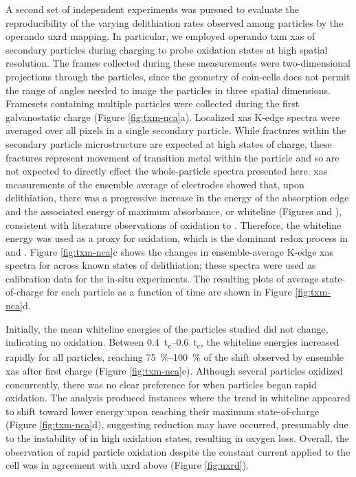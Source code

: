 \documentclass{WileyMSP-template}
\begin{document}
A second set of independent experiments was pursued to evaluate the
reproducibility of the varying delithiation rates observed among
particles by the operando \gls{uxrd} mapping. In particular, we
employed operando \Gls{txm} \gls{xas} of \nca{} secondary particles
during charging to probe  oxidation states at high spatial
resolution. The frames collected during these measurements were
two-dimensional projections through the particles, since the geometry
of coin-cells does not permit the range of angles needed to image the
particles in three spatial dimensions. Framesets containing multiple
particles were collected during the first galvanostatic charge (Figure
\ref{fig:txm-nca}a). Localized \gls{xas} K-edge spectra were averaged
over all pixels in a single secondary particle. While fractures within
the secondary particle microstructure are expected at high states of
charge\cite{tsai2018}, these fractures represent movement of
transition metal within the particle and so are not expected to
directly effect the whole-particle spectra presented here. \gls{xas}
measurements of the ensemble average of electrodes showed that, upon
delithiation, there was a progressive increase in the energy of the
absorption edge and the associated energy of maximum absorbance, or
whiteline (Figures  and
), consistent with literature
observations of  oxidation to
\cite{deb2005,muto2009}. Therefore, the whiteline energy
was used as a proxy for  oxidation, which is the dominant redox
process in \nca{} and \nmc{}. Figure \ref{fig:txm-nca}c shows the
changes in ensemble-average  K-edge \gls{xas} spectra for
\nca{} across known states of delithiation; these spectra were used as
calibration data for the in-situ experiments. The resulting plots of
average state-of-charge for each particle as a function of time are
shown in Figure \ref{fig:txm-nca}d.

Initially, the mean whiteline energies of the particles studied did
not change, indicating no  oxidation. Between
\SIrange{0.4}{0.6}{t_c}, the whiteline energies increased rapidly for
all particles, reaching \SIrange{75}{100}{\percent} of the shift
observed by ensemble \gls{xas} after first charge (Figure
\ref{fig:txm-nca}c). Although several particles oxidized concurrently,
there was no clear preference for when particles began rapid
oxidation. The analysis produced instances where the trend in
whiteline appeared to shift toward lower energy upon reaching their
maximum state-of-charge (Figure \ref{fig:txm-nca}d), suggesting
 reduction may have occurred, presumably due to the instability
of  in high oxidation states\cite{myung2020-2}, resulting in
oxygen loss. Overall, the observation of rapid particle oxidation
despite the constant current applied to the cell was in agreement with
\gls{uxrd} above (Figure \ref{fig:uxrd}).
\end{document}
